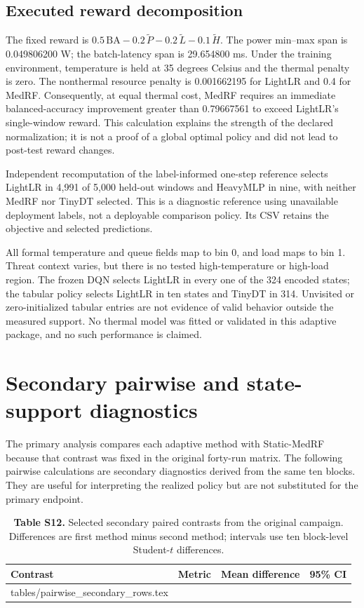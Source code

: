 \documentclass[10pt,a4paper]{article}
\makeatletter
\newcommand{\tableinput}[1]{\@@input #1.tex }
\makeatother
\begin{document}
\subsection{Executed reward decomposition}
The fixed reward is $0.5\,\mathrm{BA}-0.2\,\widetilde P-0.2\,\widetilde L-0.1\,\widetilde H$. The power min--max span is 0.049806200 W; the batch-latency span is 29.654800 ms. Under the training environment, temperature is held at 35 degrees Celsius and the thermal penalty is zero. The nonthermal resource penalty is 0.001662195 for LightLR and 0.4 for MedRF. Consequently, at equal thermal cost, MedRF requires an immediate balanced-accuracy improvement greater than 0.79667561 to exceed LightLR's single-window reward. This calculation explains the strength of the declared normalization; it is not a proof of a global optimal policy and did not lead to post-test reward changes.

Independent recomputation of the label-informed one-step reference selects LightLR in 4,991 of 5,000 held-out windows and HeavyMLP in nine, with neither MedRF nor TinyDT selected. This is a diagnostic reference using unavailable deployment labels, not a deployable comparison policy. Its CSV retains the objective and selected predictions.

All formal temperature and queue fields map to bin 0, and load maps to bin 1. Threat context varies, but there is no tested high-temperature or high-load region. The frozen DQN selects LightLR in every one of the 324 encoded states; the tabular policy selects LightLR in ten states and TinyDT in 314. Unvisited or zero-initialized tabular entries are not evidence of valid behavior outside the measured support. No thermal model was fitted or validated in this adaptive package, and no such performance is claimed.

\clearpage
\section{Secondary pairwise and state-support diagnostics}
The primary analysis compares each adaptive method with Static-MedRF because that contrast was fixed in the original forty-run matrix. The following pairwise calculations are secondary diagnostics derived from the same ten blocks. They are useful for interpreting the realized policy but are not substituted for the primary endpoint.

\begin{table}[h!]
\centering\small
\caption*{\textbf{Table S12.} Selected secondary paired contrasts from the original campaign. Differences are first method minus second method; intervals use ten block-level Student-$t$ differences.}
\begin{tabular}{llrr}\toprule
Contrast & Metric & Mean difference & 95\% CI\\\midrule
\tableinput{tables/pairwise_secondary_rows}
\bottomrule\end{tabular}
\end{table}
\end{document}
